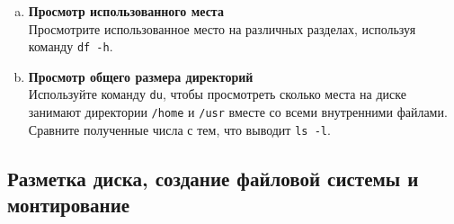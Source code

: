 \documentclass{article}
\begin{document}
\begin{enumerate}[a.]
\item \textbf{Просмотр использованного места}\\
Просмотрите использованное место на различных разделах, используя команду \texttt{df -h}.

\item \textbf{Просмотр общего размера директорий}\\
Используйте команду \texttt{du}, чтобы просмотреть сколько места на диске занимают директории \texttt{/home} и \texttt{/usr} вместе со всеми внутренними файлами. Сравните полученные числа с тем, что выводит \texttt{ls -l}.

\end{enumerate}


\newpage
\subsection{Разметка диска, создание файловой системы и монтирование}
\end{document}
